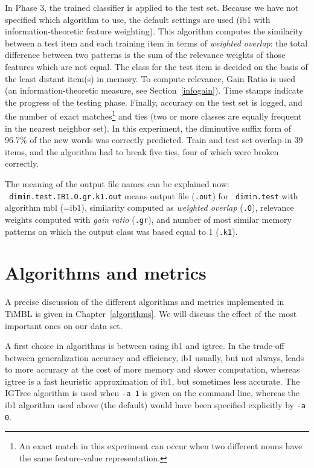 \documentclass{book}
\begin{document}
In Phase 3, the trained classifier is applied to the test set. Because
we have not specified which algorithm to use, the default settings are
used ({\sc ib1} with information-theoretic feature weighting). This
algorithm computes the similarity between a test item and each
training item in terms of {\em weighted overlap}: the total difference
between two patterns is the sum of the relevance weights of those
features which are not equal. The class for the test item is decided
on the basis of the least distant item(s) in memory. To compute
relevance, Gain Ratio is used (an information-theoretic measure, see
Section~\ref{infogain}). Time stamps indicate the progress of the
testing phase. Finally, accuracy on the test set is logged, and the
number of exact matches\footnote{An exact match in this experiment can
  occur when two different nouns have the same feature-value
  representation.} and ties (two or more classes are equally frequent
in the nearest neighbor set). In this experiment, the diminutive
suffix form of 96.7\% of the new words was correctly predicted. Train
and test set overlap in 39 items, and the algorithm had to break five
ties, four of which were broken correctly.

The meaning of the output file names can be explained now:\\ {\tt
dimin.test.IB1.O.gr.k1.out} means output file ({\tt .out}) for {\tt
dimin.test} with algorithm {\sc mbl} (={\sc ib1}), similarity computed
as {\em weighted overlap} ({\tt .O}), relevance weights computed with
{\em gain ratio} ({\tt .gr}), and number of most similar memory
patterns on which the output class was based equal to 1 ({\tt .k1}).

\section{Algorithms and metrics}

A precise discussion of the different algorithms and metrics
implemented in TiMBL is given in Chapter~\ref{algorithms}. We will
discuss the effect of the most important ones on our data set.

A first choice in algorithms is between using {\sc ib1} and {\sc
igtree}. In the trade-off between generalization accuracy and
efficiency, {\sc ib1} usually, but not always, leads to more accuracy
at the cost of more memory and slower computation, whereas {\sc
igtree} is a fast heuristic approximation of {\sc ib1}, but sometimes
less accurate. The {\sc IGTree} algorithm is used when {\tt -a 1} is
given on the command line, whereas the {\sc ib1} algorithm used above
(the default) would have been specified explicitly by {\tt -a 0}.
\end{document}
